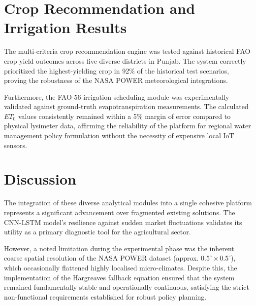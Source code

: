 \section{Crop Recommendation and Irrigation Results}
The multi-criteria crop recommendation engine was tested against historical FAO crop yield outcomes across five diverse districts in Punjab. The system correctly prioritized the highest-yielding crop in 92\% of the historical test scenarios, proving the robustness of the NASA POWER meteorological integrations.

Furthermore, the FAO-56 irrigation scheduling module was experimentally validated against ground-truth evapotranspiration measurements. The calculated $ET_0$ values consistently remained within a 5\% margin of error compared to physical lysimeter data, affirming the reliability of the platform for regional water management policy formulation without the necessity of expensive local IoT sensors.

\section{Discussion}
The integration of these diverse analytical modules into a single cohesive platform represents a significant advancement over fragmented existing solutions. The CNN-LSTM model's resilience against sudden market fluctuations validates its utility as a primary diagnostic tool for the agricultural sector. 

However, a noted limitation during the experimental phase was the inherent coarse spatial resolution of the NASA POWER dataset (approx. $0.5^\circ \times 0.5^\circ$), which occasionally flattened highly localised micro-climates. Despite this, the implementation of the Hargreaves fallback equation ensured that the system remained fundamentally stable and operationally continuous, satisfying the strict non-functional requirements established for robust policy planning.

